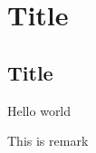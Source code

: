 \documentclass[12pt,a4paper,violet]{bbe}
\begin{document}
	\chapter{Title}
	\section{Title}
	\begin{definition}
	Hello world
	\end{definition}
	\begin{remark}
	This is remark
	\end{remark}
	\blinddocument
\end{document}
